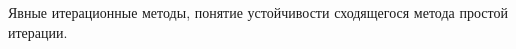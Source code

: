 \documentclass[__main__.tex]{subfiles}
\begin{document}
Явные итерационные методы, понятие устойчивости сходящегося метода простой итерации.
\end{document}

